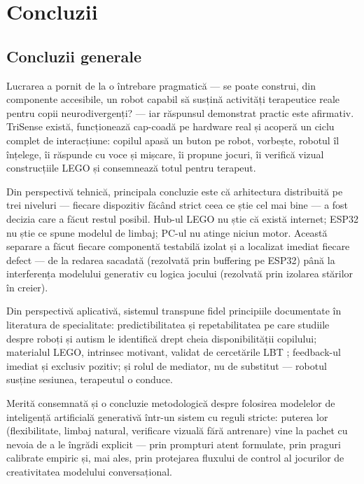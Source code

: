\chapter{Concluzii}
\label{cap:concluzii}

\section{Concluzii generale}

Lucrarea a pornit de la o întrebare pragmatică — se poate construi, din componente accesibile, un robot capabil să susțină activități terapeutice reale pentru copii neurodivergenți? — iar răspunsul demonstrat practic este afirmativ. TriSense există, funcționează cap-coadă pe hardware real și acoperă un ciclu complet de interacțiune: copilul apasă un buton pe robot, vorbește, robotul îl înțelege, îi răspunde cu voce și mișcare, îi propune jocuri, îi verifică vizual construcțiile LEGO și consemnează totul pentru terapeut.

Din perspectivă tehnică, principala concluzie este că arhitectura distribuită pe trei niveluri — fiecare dispozitiv făcând strict ceea ce știe cel mai bine — a fost decizia care a făcut restul posibil. Hub-ul LEGO nu știe că există internet; ESP32 nu știe ce spune modelul de limbaj; PC-ul nu atinge niciun motor. Această separare a făcut fiecare componentă testabilă izolat și a localizat imediat fiecare defect — de la redarea sacadată (rezolvată prin buffering pe ESP32) până la interferența modelului generativ cu logica jocului (rezolvată prin izolarea stărilor în creier).

Din perspectivă aplicativă, sistemul transpune fidel principiile documentate în literatura de specialitate: predictibilitatea și repetabilitatea pe care studiile despre roboți și autism \cite{scassellati2012, dautenhahn2004} le identifică drept cheia disponibilității copilului; materialul LEGO, intrinsec motivant, validat de cercetările LBT \cite{legoff2004, owens2008}; feedback-ul imediat și exclusiv pozitiv; și rolul de mediator, nu de substitut — robotul susține sesiunea, terapeutul o conduce.

Merită consemnată și o concluzie metodologică despre folosirea modelelor de inteligență artificială generativă într-un sistem cu reguli stricte: puterea lor (flexibilitate, limbaj natural, verificare vizuală fără antrenare) vine la pachet cu nevoia de a le îngrădi explicit — prin prompturi atent formulate, prin praguri calibrate empiric și, mai ales, prin protejarea fluxului de control al jocurilor de creativitatea modelului conversațional.

